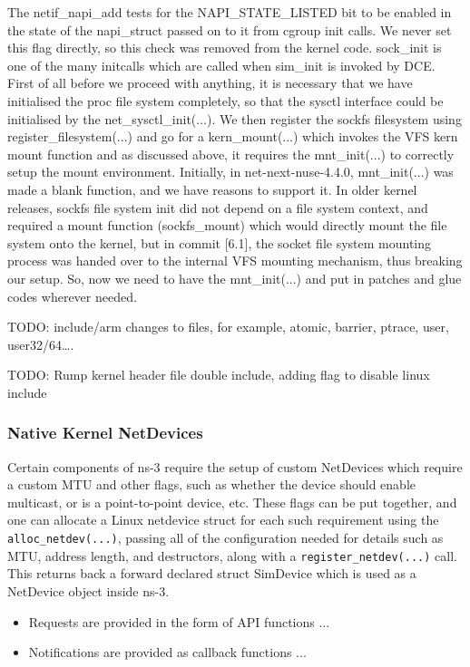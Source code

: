 \documentclass{sig-alternate}
\begin{document}
The netif\_napi\_add tests for the NAPI\_STATE\_LISTED bit to be enabled in the state of the napi\_struct passed on to it from cgroup init calls. 
We never set this flag directly, so this check was removed from the kernel code. sock\_init is one of the many initcalls which are called when 
sim\_init is invoked by DCE. First of all before we proceed with anything, it is necessary that we have initialised the proc file system completely,
so that the sysctl interface could be initialised by the net\_sysctl\_init(...). We then register the sockfs filesystem using register\_filesystem(...) 
and go for a kern\_mount(...) which invokes the VFS kern mount function and as discussed above, it requires the mnt\_init(...) to correctly setup 
the mount environment. Initially, in net-next-nuse-4.4.0, mnt\_init(...)  was made a blank function, and we have reasons to support it. 
In older kernel releases, sockfs file system init did not depend on a file system context, and required a mount function (sockfs\_mount) which
would directly mount the file system onto the kernel, but in commit [6.1], the socket file system mounting process was handed over to the
internal VFS mounting mechanism, thus breaking our setup. So, now we need to have the mnt\_init(...) and put in patches and glue codes wherever
needed.

TODO: include/arm changes to files, for example, atomic, barrier, ptrace, user, user32/64….

TODO: Rump kernel header file double include, adding flag to disable linux include

\subsubsection{Native Kernel NetDevices}
Certain components of ns-3 require the setup of custom NetDevices which require a custom MTU and other flags, such as whether the device should enable multicast, or is a point-to-point device, etc. These flags can be put together, and one can allocate a Linux netdevice struct for each such requirement using
the \texttt{alloc\_netdev(...)}, passing all of the configuration needed for details such as MTU, address length, and destructors, along with a \texttt{register\_netdev(...)} call.
This returns back a forward declared struct SimDevice which is used as a NetDevice object inside ns-3.

\begin{itemize}
 \item Requests are provided in the form of API functions ...
 \item Notifications are provided as callback functions ...
\end{itemize}
\end{document}
